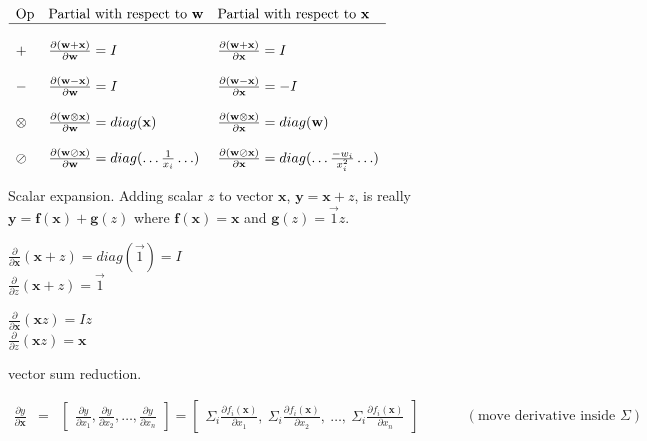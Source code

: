 \documentclass[11pt]{article}
\begin{document}
$
\begin{array}{lllll}
\text{Op} & \text{Partial with respect to } \mathbf{w} & \text{Partial with respect to }\mathbf{x}\\
\hline\\

+ & \frac{\partial (\mathbf{w+x})}{\partial \mathbf{w}} = I & \frac{\partial (\mathbf{w+x})}{\partial \mathbf{x}} =  I\\\\

- & \frac{\partial (\mathbf{w-x})}{\partial \mathbf{w}}  = I & \frac{\partial (\mathbf{w-x})}{\partial \mathbf{x}}  = -I \\\\

\otimes & \frac{\partial (\mathbf{w \otimes x})}{\partial \mathbf{w}}  =  diag(\mathbf{x}) & \frac{\partial (\mathbf{w \otimes x})}{\partial \mathbf{x}}  =  diag(\mathbf{w})\\\\

\oslash & \frac{\partial (\mathbf{w \oslash x})}{\partial \mathbf{w}}  =  diag(\ldots \frac{1}{x_i} \ldots) & \frac{\partial (\mathbf{w \oslash x})}{\partial \mathbf{x}}  =  diag(\ldots \frac{-w_i}{x_i^2} \ldots)\\

\end{array}
$

Scalar expansion. Adding scalar $z$  to vector $\mathbf{x}$, $\mathbf{y} = \mathbf{x} + z$, is really $\mathbf{y} = \mathbf{f(x)} + \mathbf{g}(z)$ where $\mathbf{f(x)} = \mathbf{x}$ and $\mathbf{g}(z) = \vec{1} z$.

$\frac{\partial}{\partial \mathbf{x}} ( \mathbf{x} + z ) = diag(\vec{1}) = I$\\
$\frac{\partial}{\partial z} ( \mathbf{x} + z ) = \vec{1}$

$\frac{\partial}{\partial \mathbf{x}} ( \mathbf{x} z ) = I z$\\
$\frac{\partial}{\partial z} ( \mathbf{x} z ) = \mathbf{x}$

vector sum reduction. 

$
\begin{array}{lcl}
\frac{\partial y}{\partial \mathbf{x}} & = & \begin{bmatrix} \frac{\partial y}{\partial x_1}, \frac{\partial y}{\partial x_2}, \ldots, \frac{\partial y}{\partial x_n} \end{bmatrix} = \begin{bmatrix} \Sigma_i \frac{\partial f_i(\mathbf{x})}{\partial x_1},~ \Sigma_i \frac{\partial f_i(\mathbf{x})}{\partial x_2},~ \ldots,~ \Sigma_i \frac{\partial f_i(\mathbf{x})}{\partial x_n}  \end{bmatrix}~~~~~~~~~~~~~~~(\text{move derivative inside }\Sigma)\\\\
\end{array}
$
\end{document}
